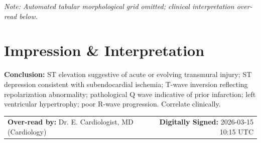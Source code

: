 \documentclass[10pt,a4paper]{article}
\begin{document}
\vspace{10pt}
\noindent
\textit{Note: Automated tabular morphological grid omitted; clinical interpretation over-read below.}

\vspace{12pt}

\section*{Impression \& Interpretation}

\noindent
\textbf{Conclusion:} ST elevation suggestive of acute or evolving transmural injury; ST depression consistent with subendocardial ischemia; T-wave inversion reflecting repolarization abnormality; pathological Q wave indicative of prior infarction; left ventricular hypertrophy; poor R-wave progression. Correlate clinically.

\vspace{18pt}

\noindent
\begin{tabular*}{\textwidth}{@{} l @{\extracolsep{\fill}} r @{}}
  \textbf{Over-read by:} Dr. E. Cardiologist, MD (Cardiology) & \textbf{Digitally Signed:} 2026-03-15 10:15 UTC \\
\end{tabular*}
\end{document}
